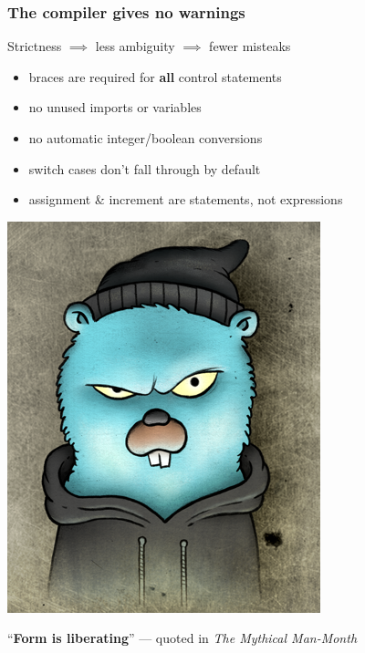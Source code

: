 \documentclass[handout,compress,t,11pt]{beamer}
\begin{document}
\begin{frame}[fragile]
    \frametitle{The compiler gives no warnings}
    Strictness $\implies$ less ambiguity $\implies$ fewer misteaks\par
        \vspace{0.4\baselineskip}
    \begin{minipage}[c]{0.55\textwidth}
    \begin{itemize}
        \item braces are required for {\bf all} control statements
        \vspace{0.4\baselineskip}
        \item no unused imports or variables
        \vspace{0.4\baselineskip}
        \item no automatic integer/boolean conversions
        \vspace{0.4\baselineskip}
        \item switch cases don't fall through by default
        \vspace{0.4\baselineskip}
        \item assignment \& increment are statements, not expressions
    \end{itemize}
    \end{minipage}%
    \begin{minipage}[c]{0.35\textwidth}
        \hfill \includegraphics[height=.45\textheight]{black-hat-go.png}
    \end{minipage} \par
    \vspace{1\baselineskip}
    ``{\bf Form is liberating}'' --- quoted in {\em The Mythical Man-Month} 
\end{frame}
\end{document}
